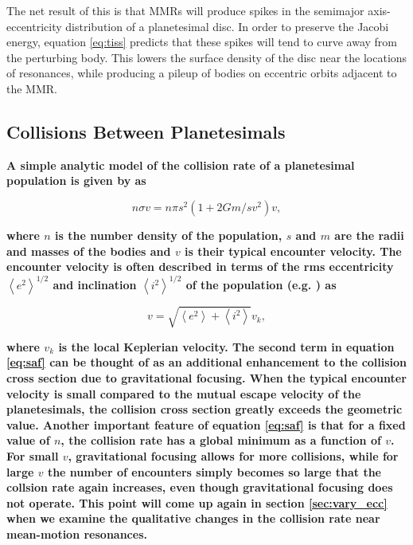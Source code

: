 \documentclass[fleqn,usenatbib]{mnras}
\begin{document}
The net result of this is that MMRs will produce spikes in the semimajor axis-eccentricity distribution of a planetesimal disc. In order to 
preserve the Jacobi energy, equation \ref{eq:tiss} predicts that these spikes will tend to curve away from the perturbing body. This lowers the 
surface density of the disc near the locations of resonances, while producing a pileup of bodies on eccentric orbits adjacent to the MMR. 

\subsection{Collisions Between Planetesimals}\label{sec:colleq}

\textbf{A simple analytic model of the collision rate of a planetesimal population is given by \citet{1969edo..book.....S} as}

\begin{equation}\label{eq:saf}
	n \sigma v = n \pi s^{2} \left( 1 + 2 G m / s v^{2} \right) v,
\end{equation}

\textbf{\noindent where $n$ is the number density of the population, $s$ and $m$ are the radii and masses of the bodies and $v$ is their typical encounter velocity. The encounter velocity is often described in terms of the rms eccentricity $\left<e^{2}\right>^{1/2}$ and inclination $\left<i^{2}\right>^{1/2}$ of the population (e.g. \citet{1993ARA&A..31..129L}) as}

\begin{equation}\label{eq:eccincvel}
	v = \sqrt{\left< e^{2} \right> + \left< i^{2} \right>} v_{k},
\end{equation}

\textbf{\noindent where $v_{k}$ is the local Keplerian velocity. The second term in equation \ref{eq:saf} can be thought of as an additional enhancement to the collision cross section due to gravitational focusing. When the typical encounter velocity is small compared to the mutual escape velocity of the planetesimals, the collision cross section greatly exceeds the geometric value. Another important feature of equation \ref{eq:saf} is that for a fixed value of $n$, the collision rate has a global minimum as a function of $v$. For small $v$, gravitational focusing allows for more collisions, while for large $v$ the number of encounters simply becomes so large that the collsion rate again increases, even though gravitational focusing does not operate. This point will come up again in section \ref{sec:vary_ecc} when we examine the qualitative changes in the collision rate near mean-motion resonances.}
\end{document}

